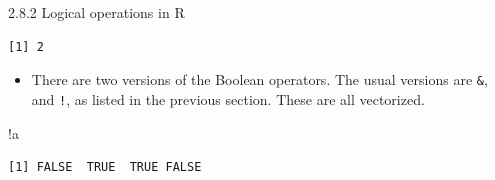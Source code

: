 \documentclass[
  9pt,
  a4paper,
  ignorenonframetext,
  notheorems]{beamer}
\newenvironment{Shaded}{\begin{snugshade}}{\end{snugshade}}
\newcommand{\NormalTok}[1]{\textcolor[rgb]{0.00,0.23,0.31}{#1}}
\newcommand{\SpecialCharTok}[1]{\textcolor[rgb]{0.37,0.37,0.37}{#1}}
\providecommand{\tightlist}{%
  \setlength{\itemsep}{0pt}\setlength{\parskip}{0pt}}\usepackage{longtable,booktabs,array}
\begin{document}
\begin{frame}[fragile]
\begin{block}{2.8.2 Logical operations in R}
\begin{verbatim}
[1] 2
\end{verbatim}

\begin{itemize}
\tightlist
\item
  There are two versions of the Boolean operators. The usual versions
  are \texttt{\&}, \texttt{\textbar{}} and \texttt{!}, as listed in the
  previous section. These are all vectorized.
\end{itemize}

\begin{Shaded}
\begin{Highlighting}[]
\SpecialCharTok{!}\NormalTok{a}
\end{Highlighting}
\end{Shaded}

\begin{verbatim}
[1] FALSE  TRUE  TRUE FALSE
\end{verbatim}
\end{block}
\end{frame}
\end{document}
